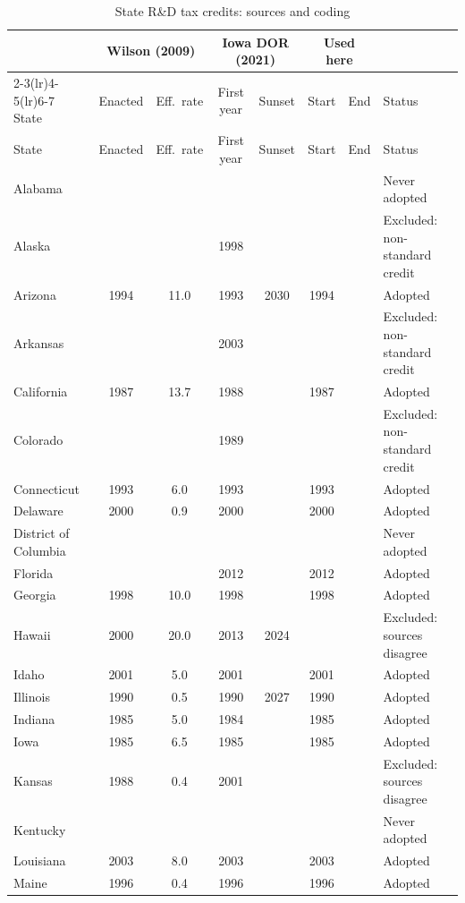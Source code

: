 \begin{longtable}{lccccccl}
\caption{State R\&D tax credits: sources and coding}\label{tab:policy}\\
\toprule
 & \multicolumn{2}{c}{Wilson (2009)} & \multicolumn{2}{c}{Iowa DOR (2021)} & \multicolumn{2}{c}{Used here} & \\
\cmidrule(lr){2-3}\cmidrule(lr){4-5}\cmidrule(lr){6-7}
State & Enacted & Eff.\ rate & First year & Sunset & Start & End & Status \\
\midrule
\endfirsthead
\toprule
State & Enacted & Eff.\ rate & First year & Sunset & Start & End & Status \\
\midrule
\endhead
Alabama &  &  &  &  &  &  & Never adopted \\
Alaska &  &  & 1998 &  &  &  & Excluded: non-standard credit \\
Arizona & 1994 & 11.0 & 1993 & 2030 & 1994 &  & Adopted \\
Arkansas &  &  & 2003 &  &  &  & Excluded: non-standard credit \\
California & 1987 & 13.7 & 1988 &  & 1987 &  & Adopted \\
Colorado &  &  & 1989 &  &  &  & Excluded: non-standard credit \\
Connecticut & 1993 & 6.0 & 1993 &  & 1993 &  & Adopted \\
Delaware & 2000 & 0.9 & 2000 &  & 2000 &  & Adopted \\
District of Columbia &  &  &  &  &  &  & Never adopted \\
Florida &  &  & 2012 &  & 2012 &  & Adopted \\
Georgia & 1998 & 10.0 & 1998 &  & 1998 &  & Adopted \\
Hawaii & 2000 & 20.0 & 2013 & 2024 &  &  & Excluded: sources disagree \\
Idaho & 2001 & 5.0 & 2001 &  & 2001 &  & Adopted \\
Illinois & 1990 & 0.5 & 1990 & 2027 & 1990 &  & Adopted \\
Indiana & 1985 & 5.0 & 1984 &  & 1985 &  & Adopted \\
Iowa & 1985 & 6.5 & 1985 &  & 1985 &  & Adopted \\
Kansas & 1988 & 0.4 & 2001 &  &  &  & Excluded: sources disagree \\
Kentucky &  &  &  &  &  &  & Never adopted \\
Louisiana & 2003 & 8.0 & 2003 &  & 2003 &  & Adopted \\
Maine & 1996 & 0.4 & 1996 &  & 1996 &  & Adopted \\

\end{longtable}
